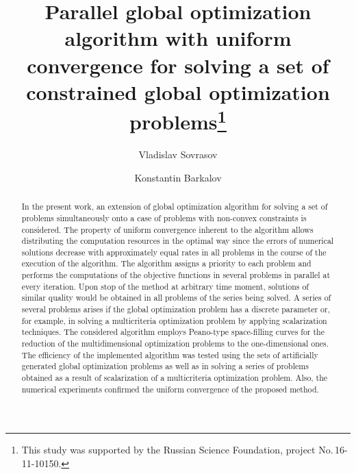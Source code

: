 \documentclass[runningheads]{llncs}
\begin{document}
%
\title{Parallel global optimization algorithm with uniform convergence
for solving a set of constrained global optimization problems\thanks{This study was supported
by the Russian Science Foundation, project No.\,16-11-10150.}}
%
%
\author{Vladislav Sovrasov\and
Konstantin Barkalov
}
%
%
%
\maketitle              %
%
\begin{abstract}
In the present work, an extension of global optimization algorithm for solving a set of problems
simultaneously onto a case of problems with non-convex constraints is considered. The property
of uniform convergence inherent to the algorithm allows distributing the computation resources
in the optimal way since the errors of numerical solutions decrease with approximately equal
rates in all problems in the course of the execution of the algorithm. The algorithm assigns a
priority to each problem and performs the computations of the objective functions in several
problems in parallel at every iteration. Upon stop of the method at arbitrary time moment,
solutions of similar quality would be obtained in all problems of the series being solved. A series
of several problems arises if the global optimization problem has a discrete parameter or, for
example, in solving a multicriteria optimization problem by applying scalarization techniques. The
considered algorithm employs Peano-type space-filling curves for the reduction of the
multidimensional optimization problems to the one-dimensional ones.  The efficiency of the
implemented algorithm was tested using the sets of artificially generated global optimization
problems as well as in solving a series of problems obtained as a result of scalarization of a
multicriteria optimization  problem. Also, the numerical experiments confirmed the uniform
convergence of the proposed method.

\end{abstract}
%
%
%
\end{document}

